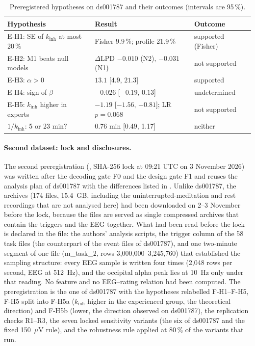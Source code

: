 \documentclass[12pt,a4paper]{article}
\theoremstyle{plain}
\theoremstyle{definition}
\theoremstyle{remark}
\newcommand{\kinh}{k_{\mathrm{inh}}}
\begin{document}
\begin{table}[H]
\centering\footnotesize
\caption{Preregistered hypotheses on ds001787 and their outcomes (intervals are 95\,\%).}
\label{tab:real-tests}
\setlength{\tabcolsep}{4pt}
\begin{tabular}{lll}
\toprule
Hypothesis & Result & Outcome \\
\midrule
E-H1: SE of $\kinh$ at most 20\,\% & Fisher 9.9\,\%; profile 21.9\,\% & supported (Fisher) \\
E-H2: M1 beats null models & $\Delta$LPD $-0.010$ (N2), $-0.031$ (N1) & not supported \\
E-H3: $\alpha>0$ & $13.1$ [$4.9$, $21.3$] & supported \\
E-H4: sign of $\beta$ & $-0.026$ [$-0.19$, $0.13$] & undetermined \\
E-H5: $\kinh$ higher in experts & $-1.19$ [$-1.56$, $-0.81$]; LR $p=0.068$ & not supported \\
$1/\kinh$: 5 or 23 min? & 0.76 min [0.49, 1.17] & neither \\
\bottomrule
\end{tabular}
\end{table}

\paragraph{Second dataset: lock and disclosures.} The second preregistration (, SHA-256 lock at 09:21 UTC on 3 November 2026) was written after the decoding gate F0 and the design gate F1 and reuses the analysis plan of ds001787 with the differences listed in . Unlike ds001787, the archives (174 files, 15.4~GB, including the uninterrupted-meditation and rest recordings that are not analysed here) had been downloaded on 2--3 November before the lock, because the files are served as single compressed archives that contain the triggers and the EEG together. What had been read before the lock is declared in the file: the authors' analysis scripts, the trigger column of the 58 task files (the counterpart of the event files of ds001787), and one two-minute segment of one file (m\_task\_2, rows 3{,}000{,}000--3{,}245{,}760) that established the sampling structure: every EEG sample is written four times (2{,}048 rows per second, EEG at 512~Hz), and the occipital alpha peak lies at 10~Hz only under that reading. No feature and no EEG--rating relation had been computed. The preregistration is the one of ds001787 with the hypotheses relabelled F-H1--F-H5, F-H5 split into F-H5a ($\kinh$ higher in the experienced group, the theoretical direction) and F-H5b (lower, the direction observed on ds001787), the replication checks R1--R3, the seven locked sensitivity variants (the six of ds001787 and the fixed 150~$\mu$V rule), and the robustness rule applied at 80\,\% of the variants that run.
\end{document}
